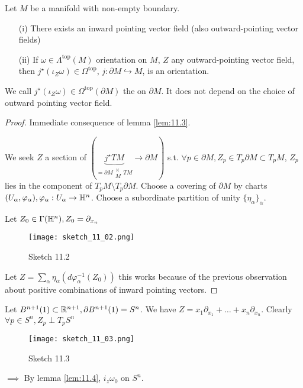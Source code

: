 \begin{lemma}\label{lem:11.4}
    Let \(M\) be a manifold with non-empty boundary.
    \begin{enumerate}
        \item[(i)] There exists an inward pointing vector field (also outward-pointing vector fields)
        \item[(ii)] If \(\omega\in\Lambda^{\text{top}}(M)\) orientation on \(M\), \(Z\) any outward-pointing vector field, then 
                    \(j^\star(\iota_Z\omega)\in \Omega^{\text{top}}\), \(j:\partial M\hookrightarrow M\), is an orientation. 
    \end{enumerate}
    We call \(j^\star(\iota_Z\omega)\in\Omega^{\text{top}}(\partial M)\) the  on \(\partial M\). It does not depend on the choice of outward pointing vector field.
\end{lemma}


\begin{proof}
     Immediate consequence of lemma \ref{lem:11.3}.

     We seek \(Z\) a section of \((\underbrace{j^\star TM}_{=\partial M\substack{\times\\M} TM}\to \partial M)\)
    s.t. \(\forall p\in \partial M, Z_p\in T_p\partial M\subset T_p M\), \(Z_p\) lies in the  component of 
    \(T_p M \setminus T_p \partial M\). Choose a covering of \(\partial M\) by charts \((U_\alpha,\varphi_\alpha),\varphi_\alpha:U_\alpha\to\mathbb{H}^n\).
    Choose a subordinate partition of unity \(\{\eta_\alpha\}_{\alpha}\).

    Let \(Z_0\in\Gamma(\mathbb{H}^n),Z_0=\partial_{x_n}\)
    \begin{figure}[H]\label{fig:11.2}
        \centering
        \texttt{[image: sketch\_11\_02.png]}
        \caption{Sketch 11.2}
    \end{figure}
    Let \(Z=\sum_{\alpha}\eta_\alpha(d\varphi_{\alpha}^{-1}(Z_0))\) this works 
    because of the previous observation about positive combinations of inward pointing vectors.    
\end{proof}

\begin{example}
    Let \(B^{n+1}(1)\subset \mathbb{R}^{n+1},\partial B^{n+1}(1)=S^n\).
    We have \(Z=x_1\partial_{x_1}+\dots+x_n\partial_{x_n}\). Clearly \(\forall p\in S^n, Z_p\perp T_p S^n\)
    \begin{figure}[H]\label{fig:11.3}
        \centering
        \texttt{[image: sketch\_11\_03.png]}
        \caption{Sketch 11.3}
    \end{figure}
    \(\implies\) By lemma \ref{lem:11.4}, \(i_z \omega_0\) on \(S^n\).
\end{example}

